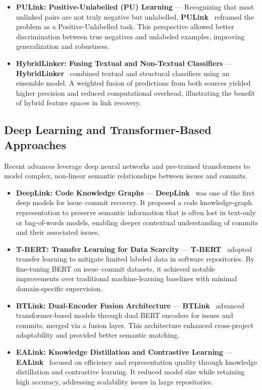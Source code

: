 \begin{itemize}
    \item \textbf{PULink: Positive-Unlabelled (PU) Learning} --- Recognizing that most unlinked pairs are not truly negative but unlabelled, \textbf{PULink}~\cite{q4} reframed the problem as a Positive-Unlabelled task. This perspective allowed better discrimination between true negatives and unlabeled examples, improving generalization and robustness.
    \item \textbf{HybridLinker: Fusing Textual and Non-Textual Classifiers} --- \textbf{HybridLinker}~\cite{q2} combined textual and structural classifiers using an ensemble model. A weighted fusion of predictions from both sources yielded higher precision and reduced computational overhead, illustrating the benefit of hybrid feature spaces in link recovery.
\end{itemize}

\subsection{Deep Learning and Transformer-Based Approaches}
Recent advances leverage deep neural networks and pre-trained transformers to model complex, non-linear semantic relationships between issues and commits.
\begin{itemize}
    \item \textbf{DeepLink: Code Knowledge Graphs} --- \textbf{DeepLink}~\cite{q1,rene3} was one of the first deep models for issue–commit recovery. It proposed a code knowledge-graph representation to preserve semantic information that is often lost in text-only or bag-of-words models, enabling deeper contextual understanding of commits and their associated issues.
    \item \textbf{T-BERT: Transfer Learning for Data Scarcity} --- \textbf{T-BERT}~\cite{rene4} adopted transfer learning to mitigate limited labeled data in software repositories. By fine-tuning BERT on issue–commit datasets, it achieved notable improvements over traditional machine-learning baselines with minimal domain-specific supervision.
    \item \textbf{BTLink: Dual-Encoder Fusion Architecture} --- \textbf{BTLink}~\cite{btlink} advanced transformer-based models through dual BERT encoders for issues and commits, merged via a fusion layer. This architecture enhanced cross-project adaptability and provided better semantic matching.
    \item \textbf{EALink: Knowledge Distillation and Contrastive Learning} --- \textbf{EALink}~\cite{ealink} focused on efficiency and representation quality through knowledge distillation and contrastive learning. It reduced model size while retaining high accuracy, addressing scalability issues in large repositories.
\end{itemize}

